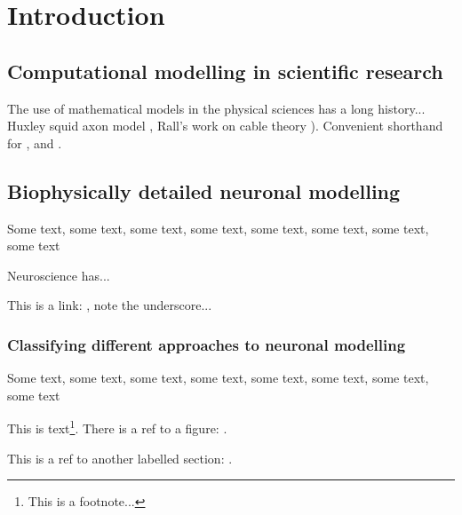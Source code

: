 

\chapter{Introduction}
\label{Introduction}

\pagestyle{fancy}                
\fancyhf{}
\cfoot{\thepage}



\section{Computational modelling in scientific research}
\label{SimsInScience}

The use of mathematical models in the physical sciences has a long history... Huxley squid axon model \citep{HodgkinHuxley1952}, Rall's work on cable theory \citep{Rall1959}). Convenient shorthand for \Nap, \Capp and \Cappc.



\section{Biophysically detailed neuronal modelling}

Some text, some text, some text, some text, some text, some text, some text, some text


Neuroscience has...

This is a link: , note the underscore... 

\subsection{Classifying different approaches to neuronal modelling}
\label{LevelsInModelling}

Some text, some text, some text, some text, some text, some text, some text, some text


This is text\footnote{This is a footnote...}. There is a ref to a figure: .


This is a ref to another labelled section: . 







